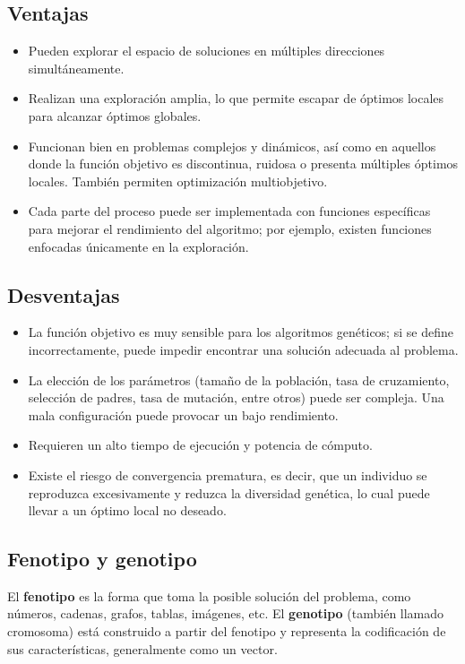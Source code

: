 \subsection{Ventajas}

\begin{itemize}
	\item Pueden explorar el espacio de soluciones en múltiples direcciones simultáneamente.
	\item Realizan una exploración amplia, lo que permite escapar de óptimos locales para alcanzar óptimos globales.
	\item Funcionan bien en problemas complejos y dinámicos, así como en aquellos donde la función objetivo es discontinua, ruidosa o presenta múltiples óptimos locales. También permiten optimización multiobjetivo.
	\item Cada parte del proceso puede ser implementada con funciones específicas para mejorar el rendimiento del algoritmo; por ejemplo, existen funciones enfocadas únicamente en la exploración.
\end{itemize}

\subsection{Desventajas}

\begin{itemize}
	\item La función objetivo es muy sensible para los algoritmos genéticos; si se define incorrectamente, puede impedir encontrar una solución adecuada al problema.
	\item La elección de los parámetros (tamaño de la población, tasa de cruzamiento, selección de padres, tasa de mutación, entre otros) puede ser compleja. Una mala configuración puede provocar un bajo rendimiento.
	\item Requieren un alto tiempo de ejecución y potencia de cómputo.
	\item Existe el riesgo de convergencia prematura, es decir, que un individuo se reproduzca excesivamente y reduzca la diversidad genética, lo cual puede llevar a un óptimo local no deseado.
\end{itemize}

\subsection{Fenotipo y genotipo}

El \textbf{fenotipo} es la forma que toma la posible solución del problema, como números, cadenas, grafos, tablas, imágenes, etc. El \textbf{genotipo} (también llamado cromosoma) está construido a partir del fenotipo y representa la codificación de sus características, generalmente como un vector.

